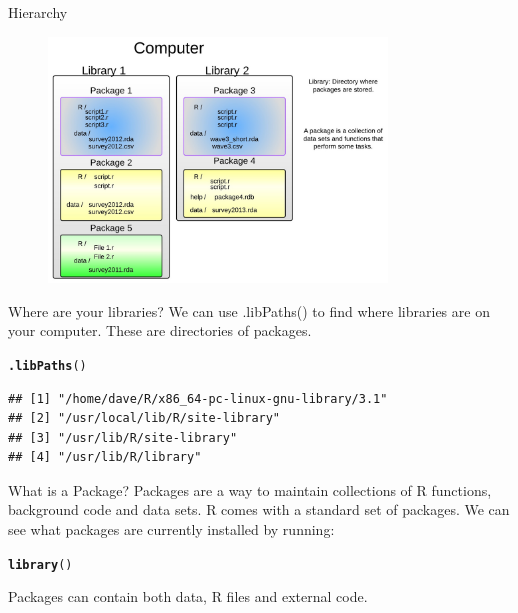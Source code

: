 \documentclass{beamer}\usepackage[]{graphicx}\usepackage[]{color}
\makeatletter
\newcommand{\hlstd}[1]{\textcolor[rgb]{0.345,0.345,0.345}{#1}}%
\newcommand{\hlkwd}[1]{\textcolor[rgb]{0.737,0.353,0.396}{\textbf{#1}}}%
\newenvironment{kframe}{%
 \def\at@end@of@kframe{}%
 \ifinner\ifhmode%
  \def\at@end@of@kframe{\end{minipage}}%
  \begin{minipage}{\columnwidth}%
 \fi\fi%
 \def\FrameCommand##1{\hskip\@totalleftmargin \hskip-\fboxsep
 \colorbox{shadecolor}{##1}\hskip-\fboxsep
     \hskip-\linewidth \hskip-\@totalleftmargin \hskip\columnwidth}%
 \MakeFramed {\advance\hsize-\width
   \@totalleftmargin\z@ \linewidth\hsize
   \@setminipage}}%
 {\par\unskip\endMakeFramed%
 \at@end@of@kframe}
\newenvironment{knitrout}{}{} %
\makeatother
\begin{document}
\begin{frame}[fragile]{Hierarchy}

\begin{figure}[ht!]
\centering
\includegraphics[width=90mm]{pictures/library_function_heirachy.png}
\label{overflow}
\end{figure}

\end{frame}


\begin{frame}[fragile]{Where are your libraries?}
We can use .libPaths() to find where libraries are on your computer.
These are directories of packages.
\begin{knitrout}
\color{fgcolor}\begin{kframe}
\begin{alltt}
\hlkwd{.libPaths}\hlstd{()}
\end{alltt}
\begin{verbatim}
## [1] "/home/dave/R/x86_64-pc-linux-gnu-library/3.1"
## [2] "/usr/local/lib/R/site-library"               
## [3] "/usr/lib/R/site-library"                     
## [4] "/usr/lib/R/library"
\end{verbatim}
\end{kframe}
\end{knitrout}
\end{frame}


\begin{frame}[fragile]{What is a Package?}
Packages are a way to maintain collections of R functions, background code and data sets.
\linebreak
R comes with a standard set of packages. We can see what packages are currently installed by running:
\begin{knitrout}
\color{fgcolor}\begin{kframe}
\begin{alltt}
\hlkwd{library}\hlstd{()}
\end{alltt}
\end{kframe}
\end{knitrout}
Packages can contain both data, R files and external code.
\end{frame}
\end{document}
